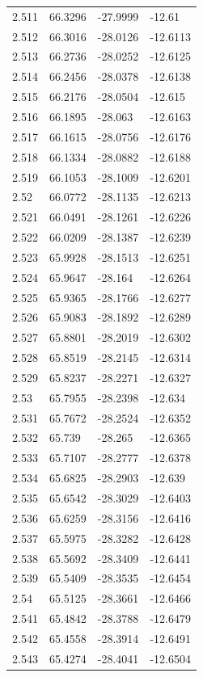 \begin{tabular}{llll}
2.511 & 66.3296 & -27.9999 & -12.61 \\
2.512 & 66.3016 & -28.0126 & -12.6113 \\
2.513 & 66.2736 & -28.0252 & -12.6125 \\
2.514 & 66.2456 & -28.0378 & -12.6138 \\
2.515 & 66.2176 & -28.0504 & -12.615 \\
2.516 & 66.1895 & -28.063 & -12.6163 \\
2.517 & 66.1615 & -28.0756 & -12.6176 \\
2.518 & 66.1334 & -28.0882 & -12.6188 \\
2.519 & 66.1053 & -28.1009 & -12.6201 \\
2.52 & 66.0772 & -28.1135 & -12.6213 \\
2.521 & 66.0491 & -28.1261 & -12.6226 \\
2.522 & 66.0209 & -28.1387 & -12.6239 \\
2.523 & 65.9928 & -28.1513 & -12.6251 \\
2.524 & 65.9647 & -28.164 & -12.6264 \\
2.525 & 65.9365 & -28.1766 & -12.6277 \\
2.526 & 65.9083 & -28.1892 & -12.6289 \\
2.527 & 65.8801 & -28.2019 & -12.6302 \\
2.528 & 65.8519 & -28.2145 & -12.6314 \\
2.529 & 65.8237 & -28.2271 & -12.6327 \\
2.53 & 65.7955 & -28.2398 & -12.634 \\
2.531 & 65.7672 & -28.2524 & -12.6352 \\
2.532 & 65.739 & -28.265 & -12.6365 \\
2.533 & 65.7107 & -28.2777 & -12.6378 \\
2.534 & 65.6825 & -28.2903 & -12.639 \\
2.535 & 65.6542 & -28.3029 & -12.6403 \\
2.536 & 65.6259 & -28.3156 & -12.6416 \\
2.537 & 65.5975 & -28.3282 & -12.6428 \\
2.538 & 65.5692 & -28.3409 & -12.6441 \\
2.539 & 65.5409 & -28.3535 & -12.6454 \\
2.54 & 65.5125 & -28.3661 & -12.6466 \\
2.541 & 65.4842 & -28.3788 & -12.6479 \\
2.542 & 65.4558 & -28.3914 & -12.6491 \\
2.543 & 65.4274 & -28.4041 & -12.6504 \\

\end{tabular}

